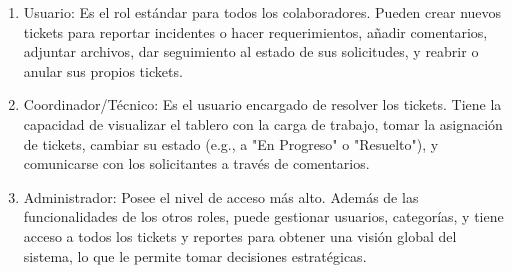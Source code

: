 \documentclass[letter,12pt]{article}
\begin{document}
\begin{enumerate}
    \item Usuario: Es el rol estándar para todos los colaboradores. Pueden crear nuevos tickets para reportar incidentes o hacer requerimientos, añadir comentarios, adjuntar archivos, dar seguimiento al estado de sus solicitudes, y reabrir o anular sus propios tickets.

    \item Coordinador/Técnico: Es el usuario encargado de resolver los tickets. Tiene la capacidad de visualizar el tablero con la carga de trabajo, tomar la asignación de tickets, cambiar su estado (e.g., a "En Progreso" o "Resuelto"), y comunicarse con los solicitantes a través de comentarios.

    \item Administrador: Posee el nivel de acceso más alto. Además de las funcionalidades de los otros roles, puede gestionar usuarios, categorías, y tiene acceso a todos los tickets y reportes para obtener una visión global del sistema, lo que le permite tomar decisiones estratégicas.
\end{enumerate}
\end{document}

